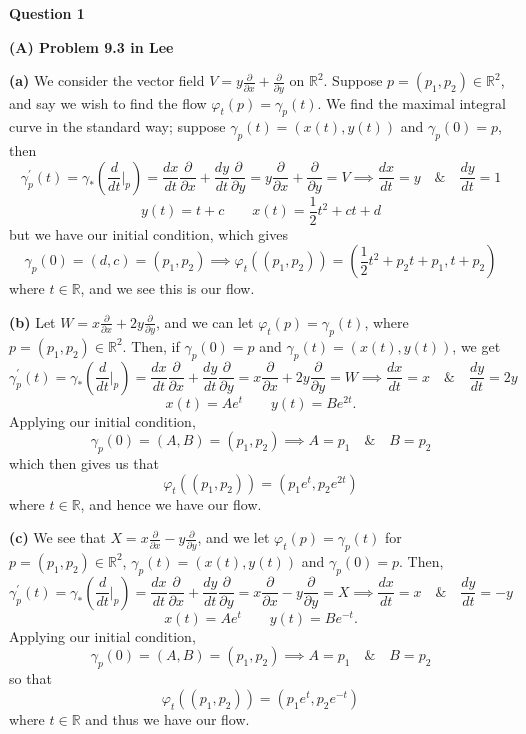 \documentclass[10pt]{article}
\newcommand{\R}{\mathbb{R}}
\newcommand{\di}[2][]{\frac{\partial #1}{\partial #2}}
\newcommand{\del}[2][]{\frac{d #1}{d #2}}
\begin{document}
\textbf{Question 1}

\textbf{(A) Problem 9.3 in Lee}

\textbf{(a)} We consider the vector field $V = y\di{x} + \di{y}$ on $\R^{2}$. Suppose $p = (p_{1},p_{2})\in\R^{2}$, and say we wish to find the flow $\varphi_{t}(p) = \gamma_{p}(t)$. We find the maximal integral curve in the standard way; suppose $\gamma_{p}(t) = (x(t),y(t))$ and $\gamma_{p}(0) = p$, then
\[ \gamma^{\prime}_{p}(t) = \gamma_{*}\left(\del{t}\bigg|_{p}\right) = \del[x]{t}\di{x} + \del[y]{t}\di{y} = y\di{x} + \di{y} = V  \implies \del[x]{t} = y \hspace{1em} \& \hspace{1em} \del[y]{t} = 1\]
\[ y(t) = t + c \hspace{2em} x(t) = \frac{1}{2}t^{2}+ct+d \]
but we have our initial condition, which gives
\[ \gamma_{p}(0) = (d,c) = (p_{1},p_{2}) \implies \varphi_{t}((p_{1},p_{2})) = (\frac{1}{2}t^{2}+p_{2}t+p_{1},t + p_{2}) \]
where $t\in \R$, and we see this is our flow.

\textbf{(b)} Let $W = x\di{x} + 2y\di{y}$, and we can let $\varphi_{t}(p) = \gamma_{p}(t)$, where $p = (p_{1},p_{2})\in \R^{2}$. Then, if $\gamma_{p}(0) = p$ and $\gamma_{p}(t) = (x(t),y(t))$, we get
\[ \gamma^{\prime}_{p}(t) = \gamma_{*}\left(\del{t}\bigg|_{p}\right) = \del[x]{t}\di{x} + \del[y]{t}\di{y} = x\di{x} + 2y\di{y} = W \implies \del[x]{t} = x \hspace{1em} \& \hspace{1em} \del[y]{t} = 2y\]
\[ x(t) = Ae^{t} \hspace{2em} y(t) = Be^{2t}. \]
Applying our initial condition,
\[ \gamma_{p}(0) = (A,B) = (p_{1},p_{2}) \implies A = p_{1} \hspace{1em} \& \hspace{1em} B = p_{2} \]
which then gives us that
\[ \varphi_{t}((p_{1},p_{2})) = (p_{1}e^{t},p_{2}e^{2t}) \]
where $t\in \R$, and hence we have our flow.

\textbf{(c)} We see that $X = x\di{x} - y\di{y}$, and we let $\varphi_{t}(p) = \gamma_{p}(t)$ for $p=(p_{1},p_{2})\in \R^{2}$, $\gamma_{p}(t) = (x(t),y(t))$ and $\gamma_{p}(0) = p$. Then,
\[ \gamma^{\prime}_{p}(t) = \gamma_{*}\left(\del{t}\bigg|_{p}\right) = \del[x]{t}\di{x} + \del[y]{t}\di{y} = x\di{x} - y\di{y} = X \implies \del[x]{t} = x \hspace{1em} \& \hspace{1em} \del[y]{t} = -y \]
\[ x(t) = Ae^{t} \hspace{2em} y(t) = Be^{-t}. \]
Applying our initial condition,
\[ \gamma_{p}(0) = (A,B) = (p_{1},p_{2}) \implies A = p_{1} \hspace{1em} \& \hspace{1em} B = p_{2} \]
so that
\[ \varphi_{t}((p_{1},p_{2})) = (p_{1}e^{t},p_{2}e^{-t}) \]
where $t\in \R$ and thus we have our flow.
\end{document}
